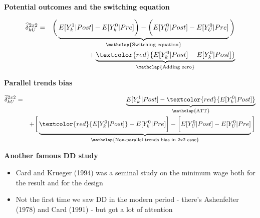 \documentclass[notes=show]{beamer}
\begin{document}
\begin{frame}[plain]
\begin{center}
\textbf{Potential outcomes and the switching equation}
\end{center}

\begin{eqnarray*}
\widehat{\delta}^{2x2}_{kU} &=& \bigg ( \underbrace{E[Y^1_k|Post] - E[Y^0_k|Pre] \bigg ) - \bigg ( E[Y^0_U | Post ] - E[ Y^0_U | Pre]}_{\mathclap{\text{Switching equation}}} \bigg)  \\
&&+ \underbrace{\textcolor{red}{E[Y_k^0 |Post] - E[Y^0_k | Post]}}_{\mathclap{\text{Adding zero}}} 
\end{eqnarray*}

\end{frame}

\begin{frame}[plain]
\begin{center}
\textbf{Parallel trends bias}
\end{center}

\begin{eqnarray*}
\widehat{\delta}^{2x2}_{kU} &=& \underbrace{E[Y^1_k | Post] - \textcolor{red}{E[Y^0_k | Post]}}_{\mathclap{\text{ATT}}} \\
&& + \bigg [  \underbrace{\textcolor{red}{E[Y^0_k | Post]} - E[Y^0_k | Pre] \bigg ] - \bigg [ E[Y^0_U | Post] - E[Y_U^0 | Pre] }_{\mathclap{\text{Non-parallel trends bias in 2x2 case}}} \bigg ]
\end{eqnarray*}


\end{frame}



\begin{frame}[plain]
	\begin{center}
	\textbf{Another famous DD study}
	\end{center}
	
	\begin{itemize}
	\item Card and Krueger (1994) was a seminal study on the minimum wage both for the result and for the design
	\item Not the first time we saw DD in the modern period - there's Ashenfelter (1978) and Card (1991) - but got a lot of attention
	\end{itemize}

\end{frame}
\end{document}
